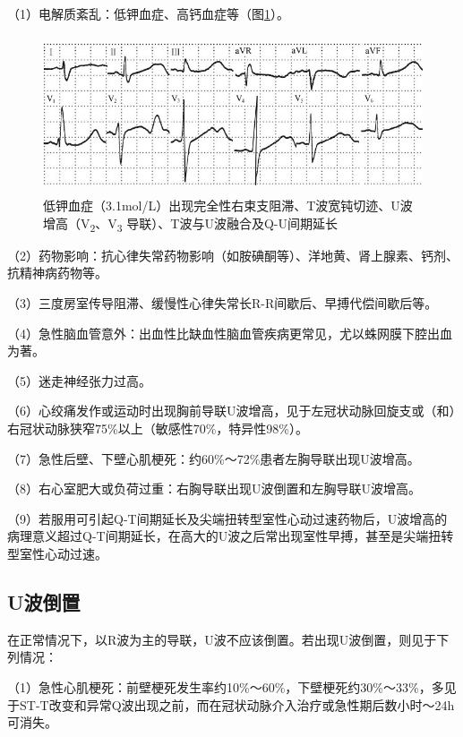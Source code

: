 （1）电解质紊乱：低钾血症、高钙血症等（图\ref{fig8-1}）。

\begin{figure}[!htbp]
 \centering
 \includegraphics[width=4.92708in,height=1.83333in]{./images/Image00120.jpg}
 \captionsetup{justification=centering}
 \caption{低钾血症（3.1mol/L）出现完全性右束支阻滞、T波宽钝切迹、U波增高（V\textsubscript{2}、V\textsubscript{3} 导联）、T波与U波融合及Q-U间期延长}
 \label{fig8-1}
  \end{figure} 


（2）药物影响：抗心律失常药物影响（如胺碘酮等）、洋地黄、肾上腺素、钙剂、抗精神病药物等。

（3）三度房室传导阻滞、缓慢性心律失常长R-R间歇后、早搏代偿间歇后等。

（4）急性脑血管意外：出血性比缺血性脑血管疾病更常见，尤以蛛网膜下腔出血为著。

（5）迷走神经张力过高。

（6）心绞痛发作或运动时出现胸前导联U波增高，见于左冠状动脉回旋支或（和）右冠状动脉狭窄75\%以上（敏感性70\%，特异性98\%）。

（7）急性后壁、下壁心肌梗死：约60\%～72\%患者左胸导联出现U波增高。

（8）右心室肥大或负荷过重：右胸导联出现U波倒置和左胸导联U波增高。

（9）若服用可引起Q-T间期延长及尖端扭转型室性心动过速药物后，U波增高的病理意义超过Q-T间期延长，在高大的U波之后常出现室性早搏，甚至是尖端扭转型室性心动过速。

\protect\hypertarget{text00014.htmlux5cux23subid111}{}{}

\subsection{U波倒置}

在正常情况下，以R波为主的导联，U波不应该倒置。若出现U波倒置，则见于下列情况：

（1）急性心肌梗死：前壁梗死发生率约10\%～60\%，下壁梗死约30\%～33\%，多见于ST-T改变和异常Q波出现之前，而在冠状动脉介入治疗或急性期后数小时～24h可消失。

